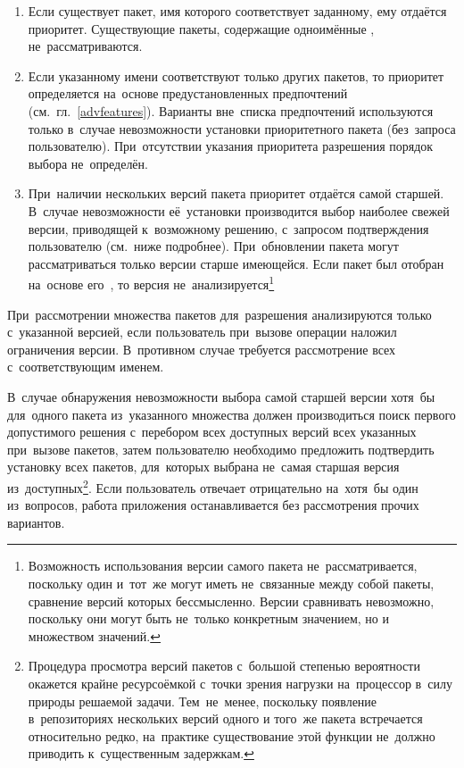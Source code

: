 \begin{enumerate}

\item{
Если существует пакет, имя которого соответствует заданному, ему отдаётся приоритет.
Существующие пакеты, содержащие одноимённые , не~рассматриваются.
}

\item {
Если указанному имени соответствуют только  других пакетов,
то приоритет определяется на~основе предустановленных предпочтений (см.~гл.~\ref{advfeatures}).
Варианты вне~списка предпочтений используются только в~случае невозможности установки приоритетного пакета (без~запроса пользователю).
При~отсутствии указания приоритета разрешения  порядок выбора не~определён.
}

\item {
При~наличии нескольких версий пакета приоритет отдаётся самой старшей.
В~случае невозможности её~установки производится выбор наиболее свежей версии, приводящей к~возможному решению, с~запросом подтверждения пользователю (см.~ниже подробнее).
При~обновлении пакета могут рассматриваться только версии старше имеющейся.
Если пакет был отобран на~основе его~, 
то версия не~анализируется\footnote{
Возможность использования версии самого пакета не~рассматривается,
поскольку один и~тот~же  могут иметь не~связанные между собой пакеты, сравнение версий которых бессмысленно.
Версии  сравнивать невозможно, поскольку они могут быть не~только конкретным значением, но и множеством значений.}
}

\end{enumerate}

При~рассмотрении множества пакетов для~разрешения 
анализируются  только с~указанной версией, если пользователь при~вызове операции наложил ограничения версии.
В~противном случае требуется рассмотрение всех  с~соответствующим именем.

В~случае обнаружения невозможности выбора самой старшей версии хотя~бы для~одного пакета из~указанного множества
должен производиться поиск первого допустимого решения с~перебором всех доступных версий всех указанных при~вызове пакетов,
затем пользователю необходимо предложить подтвердить установку всех пакетов, для~которых выбрана не~самая старшая версия из~доступных\footnote{
Процедура просмотра версий пакетов с~большой степенью вероятности окажется крайне ресурсоёмкой с~точки зрения нагрузки на~процессор в~силу природы решаемой задачи.
Тем~не~менее, поскольку появление в~репозиториях нескольких версий одного и того~же пакета встречается относительно редко,
на~практике существование этой функции не~должно приводить к~существенным задержкам.
}.
Если пользователь отвечает отрицательно на~хотя~бы один из~вопросов, работа приложения останавливается без рассмотрения прочих вариантов.

